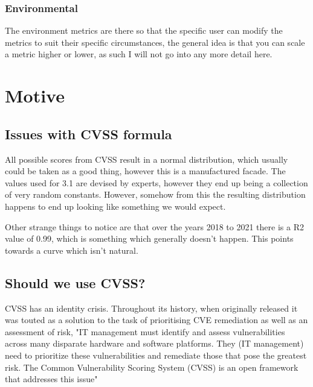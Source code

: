\documentclass[11pt]{article}
\begin{document}

\subsubsection*{Environmental}

The environment metrics are there so that the specific user can modify the metrics to suit their specific circumstances,
the general idea is that you can scale a metric higher or lower, as such I will not go into any more detail here.

\section{Motive}

\subsection{Issues with CVSS formula}

All possible scores from CVSS result in a normal distribution, which usually could be taken as a
good thing, however this is a manufactured facade. The values used for 3.1 are devised by experts,
however they end up being a collection of very random constants. However, somehow from this the
resulting distribution happens to end up looking like something we would expect.

Other strange things to notice are that over the years 2018 to 2021 there is a R2 value of 0.99,
which is something which generally doesn't happen. This points towards a curve which isn't natural.



\subsection{Should we use CVSS?}

CVSS has an identity crisis. Throughout its history, when originally released it was touted as a
solution to the task of prioritising CVE remediation as well as an assessment of risk, "IT
management must identify and assess vulnerabilities across many disparate hardware and software
platforms. They (IT management) need to prioritize these vulnerabilities and remediate those that
pose the greatest risk. The Common Vulnerability Scoring System (CVSS) is an open framework that
addresses this issue"
\end{document}
